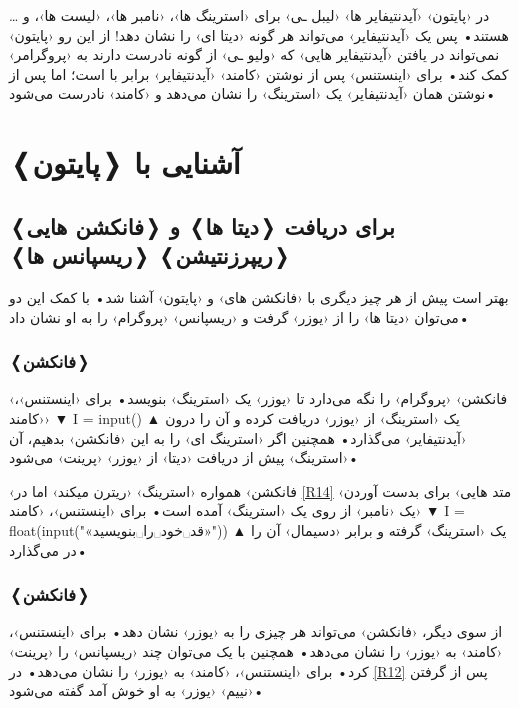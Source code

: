 \documentclass[openany, twocolumn]{book}
\begin{document}
در ‹پایتون› ‹آیدنتیفایر ها› ‹لیبل ـی› برای ‹استرینگ ها›، ‹نامبر ها›، ‹لیست ها›، و \ldots{} هستند• پس یک ‹آیدنتیفایر› می‌تواند هر گونه ‹دیتا ای› را نشان دهد! از این رو ‹پایتون› نمی‌تواند در یافتن ‹آیدنتیفایر هایی› که ‹ولیو ـی› از گونه نا‌درست دارند به ‹پروگرامر› کمک کند• برای ‹اینستنس› پس از نوشتن ‹کامند›  ‹آیدنتیفایر›  برابر با  است؛ اما پس از نوشتن  همان ‹آیدنتیفایر›  یک ‹استرینگ› را نشان می‌دهد و ‹کامند›  نا‌درست می‌شود•

\chapter{آشنایی با ❬پایتون❭}

\section{❬فانکشن هایی❭ برای دریافت ❬دیتا ها❭ و ❬ریپرزنتیشن❭ ❬ریسپانس ها❭}
بهتر است پیش از هر چیز دیگری با ‹فانکشن های›  و  ‹پایتون› آشنا شد• با کمک این دو می‌توان ‹دیتا ها› را از ‹یوزر› گرفت و ‹ریسپانس› ‹پروگرام› را به او نشان داد•

\subsection{❬فانکشن❭ }
‹فانکشن›  ‹پروگرام› را نگه می‌دارد تا ‹یوزر› یک ‹استرینگ› بنویسد• برای ‹اینستنس›، ‹کامند› 
▼
I = input()
▲
 یک ‹استرینگ› از ‹یوزر› دریافت کرده و آن را درون ‹آیدنتیفایر›  می‌گذارد• همچنین اگر ‹استرینگ ای› را به این ‹فانکشن› بدهیم، آن ‹استرینگ› پیش از دریافت ‹دیتا› از ‹یوزر› ‹پرینت› می‌شود•

‹فانکشن›  همواره ‹استرینگ› ‹ریترن میکند› اما در \ref{R14} ‹متد هایی› برای بدست آوردن یک ‹نامبر› از روی یک ‹استرینگ› آمده است• برای ‹اینستنس›، ‹کامند› 
▼
I = float(input("«قد␣خود␣را␣بنویسید»"))
▲
 یک ‹استرینگ› گرفته و برابر ‹دسیمال› آن را در  می‌گذارد•

\subsection{❬فانکشن❭ }
از سوی دیگر، ‹فانکشن›  می‌تواند هر چیزی را به ‹یوزر› نشان دهد• برای ‹اینستنس›، ‹کامند›  به ‹یوزر› {\beginL {}\endL} را نشان می‌دهد• همچنین با یک  می‌توان چند ‹ریسپانس› را ‹پرینت› کرد• برای ‹اینستنس›، ‹کامند›  به ‹یوزر›  را نشان می‌دهد• در \ref{R12} پس از گرفتن ‹نییم› ‹یوزر› به او خوش آمد گفته می‌شود•
\end{document}
